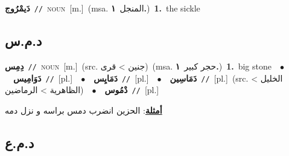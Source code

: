 \documentclass[10pt,a4paper,twoside]{article} %
\begin{document}
\begin{multicols}{2}
{\setlength\topsep{0pt}\textbf{\foreignlanguage{arabic}{دَيمْرُوج}}\ {\color{gray}\texttt{//}\color{black}}\ \textsc{noun}\ [m.]\ \color{gray}(msa. \foreignlanguage{arabic}{المنجل}~\foreignlanguage{arabic}{\textbf{١.}})\color{black}\ \textbf{1.}~the sickle\ } \vspace{2mm}

\vspace{-3mm}
\subsection*{\color{blue}\foreignlanguage{arabic}{د.م.س}\color{blue}{}} 

{\setlength\topsep{0pt}\textbf{\foreignlanguage{arabic}{دِمِس}}\ {\color{gray}\texttt{//}\color{black}}\ \textsc{noun}\ [m.]\ (src. \color{gray}\foreignlanguage{arabic}{جنين > قرى}\color{black})\ \color{gray}(msa. \foreignlanguage{arabic}{حجر كبير}~\foreignlanguage{arabic}{\textbf{١.}})\color{black}\ \textbf{1.}~big stone\ \ $\bullet$\ \ \setlength\topsep{0pt}\textbf{\foreignlanguage{arabic}{دَوَامِيس}}\ {\color{gray}\texttt{//}\color{black}}\ [pl.]\ \ $\bullet$\ \ \setlength\topsep{0pt}\textbf{\foreignlanguage{arabic}{دَمَايِس}}\ {\color{gray}\texttt{//}\color{black}}\ [pl.]\ \ $\bullet$\ \ \setlength\topsep{0pt}\textbf{\foreignlanguage{arabic}{دَمَاسِين}}\ {\color{gray}\texttt{//}\color{black}}\ [pl.]\ (src. \color{gray}\foreignlanguage{arabic}{الخليل > الظاهرية > الرماضين}\color{black})\ \ $\bullet$\ \ \setlength\topsep{0pt}\textbf{\foreignlanguage{arabic}{دْمُوس}}\ {\color{gray}\texttt{//}\color{black}}\ [pl.]\  \begin{flushright}\color{gray}\foreignlanguage{arabic}{\textbf{\underline{\foreignlanguage{arabic}{أمثلة}}}: الحزين انضرب دمس براسه و نزل دمه}\end{flushright}\color{black}} \vspace{2mm}

\vspace{-3mm}
\subsection*{\color{blue}\foreignlanguage{arabic}{د.م.ع}\color{blue}{}} 


\end{multicols}
\end{document}
